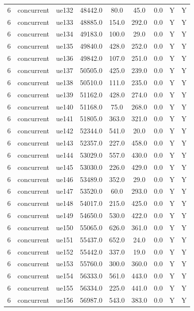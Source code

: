 \begin{table}[ht]
\begin{tabular}{|c|c|c|c|c|c|c|c|c|}
6 & concurrent & ue132 & 48442.0 & 80.0 & 45.0 & 0.0 & Y & Y \\
6 & concurrent & ue133 & 48885.0 & 154.0 & 292.0 & 0.0 & Y & Y \\
6 & concurrent & ue134 & 49183.0 & 100.0 & 29.0 & 0.0 & Y & Y \\
6 & concurrent & ue135 & 49840.0 & 428.0 & 252.0 & 0.0 & Y & Y \\
6 & concurrent & ue136 & 49842.0 & 107.0 & 251.0 & 0.0 & Y & Y \\
6 & concurrent & ue137 & 50505.0 & 425.0 & 239.0 & 0.0 & Y & Y \\
6 & concurrent & ue138 & 50510.0 & 111.0 & 235.0 & 0.0 & Y & Y \\
6 & concurrent & ue139 & 51162.0 & 428.0 & 274.0 & 0.0 & Y & Y \\
6 & concurrent & ue140 & 51168.0 & 75.0 & 268.0 & 0.0 & Y & Y \\
6 & concurrent & ue141 & 51805.0 & 363.0 & 321.0 & 0.0 & Y & Y \\
6 & concurrent & ue142 & 52344.0 & 541.0 & 20.0 & 0.0 & Y & Y \\
6 & concurrent & ue143 & 52357.0 & 227.0 & 458.0 & 0.0 & Y & Y \\
6 & concurrent & ue144 & 53029.0 & 557.0 & 430.0 & 0.0 & Y & Y \\
6 & concurrent & ue145 & 53030.0 & 226.0 & 429.0 & 0.0 & Y & Y \\
6 & concurrent & ue146 & 53489.0 & 352.0 & 29.0 & 0.0 & Y & Y \\
6 & concurrent & ue147 & 53520.0 & 60.0 & 293.0 & 0.0 & Y & Y \\
6 & concurrent & ue148 & 54017.0 & 215.0 & 425.0 & 0.0 & Y & Y \\
6 & concurrent & ue149 & 54650.0 & 530.0 & 422.0 & 0.0 & Y & Y \\
6 & concurrent & ue150 & 55065.0 & 626.0 & 361.0 & 0.0 & Y & Y \\
6 & concurrent & ue151 & 55437.0 & 652.0 & 24.0 & 0.0 & Y & Y \\
6 & concurrent & ue152 & 55442.0 & 337.0 & 19.0 & 0.0 & Y & Y \\
6 & concurrent & ue153 & 55760.0 & 300.0 & 360.0 & 0.0 & Y & Y \\
6 & concurrent & ue154 & 56333.0 & 561.0 & 443.0 & 0.0 & Y & Y \\
6 & concurrent & ue155 & 56334.0 & 225.0 & 441.0 & 0.0 & Y & Y \\
6 & concurrent & ue156 & 56987.0 & 543.0 & 383.0 & 0.0 & Y & Y \\

\end{tabular}
\end{table}
